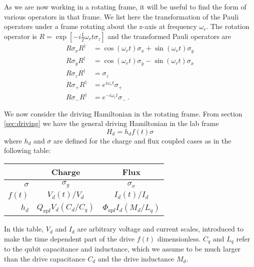 As we are now working in a rotating frame, it will be useful to find the form of various operators in that frame.
We list here the transformation of the Pauli operators under a frame rotating about the z-axis at frequency $\omega_r$.
The rotation operator is $R=\exp \left[-i \frac{1}{2} \omega_r t \sigma_z \right]$  and the transformed Pauli operators are
\begin{align*}
  R\sigma_xR^{\dagger} & = \cos(\omega_r t)\sigma_x + \sin(\omega_r t) \sigma_y \\
  R\sigma_yR^{\dagger} & = \cos(\omega_r t)\sigma_y - \sin(\omega_r t) \sigma_x \\
  R\sigma_zR^{\dagger} & = \sigma_z \\
  R\sigma_+R^{\dagger} & = e^{i\omega_r t}\sigma_+ \\
  R\sigma_-R^{\dagger} & = e^{-i\omega_r t}\sigma_- \, .
\end{align*}


We now consider the driving Hamiltonian in the rotating frame.
From section \ref{sec:driving} we have the general driving Hamiltonian in the lab frame
\begin{equation}
H_d = h_d f(t) \sigma
\end{equation}
where $h_d$ and $\sigma$ are defined for the charge and flux coupled cases as in the following table:
\begin{center}
  \begin{tabular}{|r|c|c|}
    \hline
    & \textbf{Charge} & \textbf{Flux} \\
    \hline \hline
    $\sigma$ & $\sigma_y$ & $\sigma_x$ \\
    \hline
    $f(t)$ & $V_d(t)/V_d$ & $I_d(t) / I_d$ \\
    \hline
    $h_d$ & $Q_\text{zpf} V_d(C_d/C_q)$ & $\Phi_\text{zpf} I_d (M_d/L_q)$ \\
    \hline
  \end{tabular}
\end{center}
In this table, $V_d$ and $I_d$ are arbitrary voltage and current scales, introduced to make the time dependent part of the drive $f(t)$ dimensionless.
$C_q$ and $L_q$ refer to the qubit capacitance and inductance, which we assume to be much larger than the drive capacitance $C_d$ and the drive inductance $M_d$.

